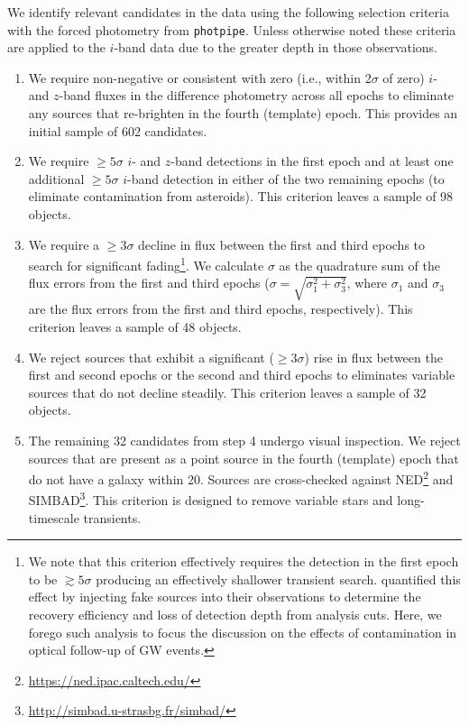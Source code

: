 We identify relevant candidates in the data using the following selection criteria with the forced photometry from {\tt photpipe}.  Unless otherwise noted these criteria are applied to the $i$-band  data due to the greater depth in those observations.
\begin{enumerate}
\item We require non-negative or consistent with zero  (i.e., within 2$\sigma$ of zero)  $i$- and $z$-band fluxes in the difference photometry across all epochs to eliminate any sources that re-brighten in the  fourth (template) epoch. This provides an initial sample of 602 candidates.

\item We require $\ge 5\sigma$ $i$- and $z$-band detections in the first epoch and at least one additional $\ge 5\sigma$ $i$-band detection in either of the two remaining epochs (to eliminate contamination from asteroids). This criterion leaves a sample of 98 objects.

\clearpage
\item We require a $\ge 3\sigma$ decline in flux between the first and third epochs to search for significant fading\footnote{\singlespace We note that this  criterion effectively requires the detection in the first epoch to be $\gtrsim 5\sigma$  producing an effectively shallower transient search.  \citet{GW150914DECam} quantified this effect by injecting fake sources into  their observations to determine the recovery efficiency and loss of detection depth from analysis cuts. Here, we forego  such analysis to focus the discussion on the effects of contamination in  optical follow-up of GW events.}. We calculate $\sigma$ as the  quadrature sum of the flux errors from the first and third epochs  ($\sigma = \sqrt{\sigma_1^2 + \sigma_3^2}$, where $\sigma_1$ and $\sigma_3$ are the flux errors from the first and third epochs, respectively). This criterion leaves a sample of 48 objects.

\item We reject sources that exhibit a significant ($\ge 3\sigma$) rise in flux  between the first and second epochs or the second and third epochs to eliminates variable  sources that do not decline steadily. This criterion leaves a sample of 32 objects.

\item The remaining 32 candidates from step 4 undergo visual inspection. We reject sources that are present as a point source in the fourth (template) epoch that do not have a galaxy within 20\arcsec. Sources are cross-checked against NED\footnote{\singlespace \url{https://ned.ipac.caltech.edu/}}  and SIMBAD\footnote{\singlespace \url{http://simbad.u-strasbg.fr/simbad/}}. This criterion is designed to remove variable stars and long-timescale transients.
\end{enumerate}


